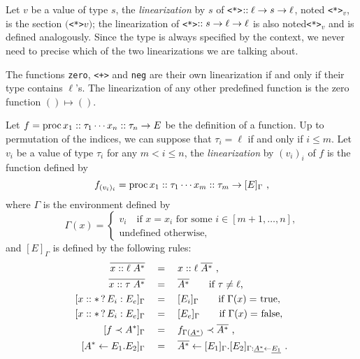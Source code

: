\begin{definition}
  Let $v$ be a value of type $s$, the \emph{linearization} by $s$ of
  \lstinline{<*>}$::\ell\rightarrow s\rightarrow\ell$, noted \lstinline{<*>}$_v$, is
  the section $($\lstinline{<*>}$v)$; the linearization of
  \lstinline{<*>}$::s\rightarrow\ell\rightarrow\ell$ is also noted\lstinline{<*>}$_v$
  and is defined analogously. Since the type is always specified by
  the context, we never need to precise which of the two
  linearizations we are talking about.
  
  The functions \lstinline{zero}, \lstinline{<+>} and \lstinline{neg}
  are their own linearization if and only if their type contains
  $\ell$'s. The linearization of any other predefined function is the
  zero function $()\mapsto()$.
\end{definition}

\begin{definition}[Linearization]
  Let $f=\operatorname{proc} x_1::\tau_1\cdots x_n::\tau_n\rightarrow E$ be the definition
  of a \tAL{} function. Up to permutation of the indices, we can
  suppose that $\tau_i=\ell$ if and only if $i\le m$. Let $v_i$ be a
  value of type $\tau_i$ for any $m<i\le n$, the \emph{linearization}
  by $(v_i)_i$ of $f$ is the function defined by
  \begin{equation}
    f_{(v_i)_i} = \operatorname{proc} x_1::\tau_1\cdots x_m::\tau_m\rightarrow [E]_\Gamma
    \text{ ,}
  \end{equation}
  where $\Gamma$ is the environment defined by
  \begin{equation}
    \Gamma(x) =
    \begin{cases}
      v_i \quad\text{if $x=x_i$ for some $i\in[m+1,\ldots,n]$,}\\
      \text{undefined otherwise,}
    \end{cases}
  \end{equation}
  and $[E]_\Gamma$ is defined by the following rules:
  \begin{align}
    \overline{x::\ell\;A^\ast} &\quad=\quad x::\ell\;\overline{A^\ast} \text{ ,}\\
    \overline{x::\tau\;A^\ast} &\quad=\quad \overline{A^\ast}
    \qquad\text{if $\tau\ne\ell$,}\\
    \label{eq:linear-if}
    [x::*\,?\,E_i:E_e]_\Gamma &\quad=\quad 
    [E_i]_\Gamma \qquad\text{if $\Gamma(x)=$ true,}\\
    \label{eq:linear-else}
    [x::*\,?\,E_i:E_e]_\Gamma &\quad=\quad 
    [E_e]_\Gamma \qquad\text{if $\Gamma(x)=$ false,}\\
    \label{eq:linear-apply}
    [f \prec A^\ast]_\Gamma &\quad=\quad f_{\Gamma(\underline{A^\ast})} \prec  \overline{A^\ast} \text{ ,}\\
    \label{eq:linear-let}
    [A^\ast\leftarrow E_1.E_2]_\Gamma &\quad=\quad
    \overline{A^\ast}\leftarrow[E_1]_\Gamma.[E_2]_{\Gamma:\underline{A^\ast}\leftarrow\underline{E_1}}
    \text{ .}
  \end{align}
\end{definition}

